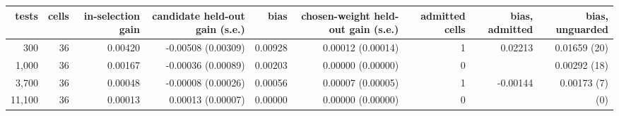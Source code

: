 \begin{tabular}{rrrrrrrrr}
\toprule
tests & cells & in-selection gain & candidate held-out gain (s.e.) & bias & chosen-weight held-out gain (s.e.) & admitted cells & bias, admitted & bias, unguarded \\
\midrule
300 & 36 & 0.00420 & -0.00508 (0.00309) & 0.00928 & 0.00012 (0.00014) & 1 & 0.02213 & 0.01659 (20) \\
1,000 & 36 & 0.00167 & -0.00036 (0.00089) & 0.00203 & 0.00000 (0.00000) & 0 &  & 0.00292 (18) \\
3,700 & 36 & 0.00048 & -0.00008 (0.00026) & 0.00056 & 0.00007 (0.00005) & 1 & -0.00144 & 0.00173 (7) \\
11,100 & 36 & 0.00013 & 0.00013 (0.00007) & 0.00000 & 0.00000 (0.00000) & 0 &  &  (0) \\
\bottomrule
\end{tabular}

